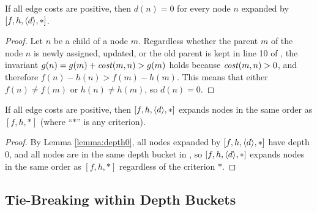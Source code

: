 

\begin{lemma} 
 \label{lemma:depth0}
  If all edge costs are positive, then
  $d(n) = 0$ for every node $n$ expanded by \astar $[f,h,\depth,*]$.
\end{lemma}
\begin{proof}
Let $n$ be a child of a node $m$.
Regardless whether the parent $m$ of the node $n$ is newly assigned, updated, or the old parent is kept in line 10 of ,
the invariant $g(n)=g(m)+\mit{cost}(m,n) > g(m)$ holds
because $\mit{cost}(m,n)>0$,
and therefore $f(n)-h(n) > f(m)-h(m)$.
This means that either $f(n)\not=f(m)$ or $h(n)\not=h(m)$, so $d(n) = 0$.
\end{proof}


\begin{theo}
  If all edge costs are positive, then \astar $[f,h,\depth,*]$ expands nodes in the same order as  \astar $[f,h,*]$ (where ``$*$'' is any criterion).
\end{theo}
\begin{proof}
  By Lemma \ref{lemma:depth0}, all nodes expanded by \astar $[f,h,\depth,*]$ have depth 0, and all nodes are in the same depth bucket in , so \astar $[f,h,\depth,*]$ expands nodes in the same order as \astar $[f,h,*]$ regardless of the criterion $*$.
\end{proof}


\subsection{Tie-Breaking within Depth Buckets}

